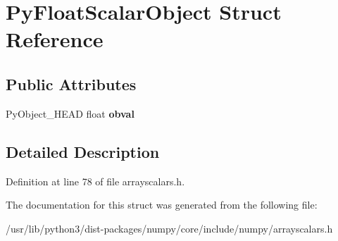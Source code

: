 \hypertarget{structPyFloatScalarObject}{}\section{Py\+Float\+Scalar\+Object Struct Reference}
\label{structPyFloatScalarObject}
\subsection*{Public Attributes}
\begin{DoxyCompactItemize}
\item 
Py\+Object\+\_\+\+H\+E\+AD float {\bfseries obval}\hypertarget{structPyFloatScalarObject_a0f07f8f0f03a6da07b1ec109592d8a2b}{}\label{structPyFloatScalarObject_a0f07f8f0f03a6da07b1ec109592d8a2b}

\end{DoxyCompactItemize}


\subsection{Detailed Description}


Definition at line 78 of file arrayscalars.\+h.



The documentation for this struct was generated from the following file\+:\begin{DoxyCompactItemize}
\item 
/usr/lib/python3/dist-\/packages/numpy/core/include/numpy/arrayscalars.\+h\end{DoxyCompactItemize}
